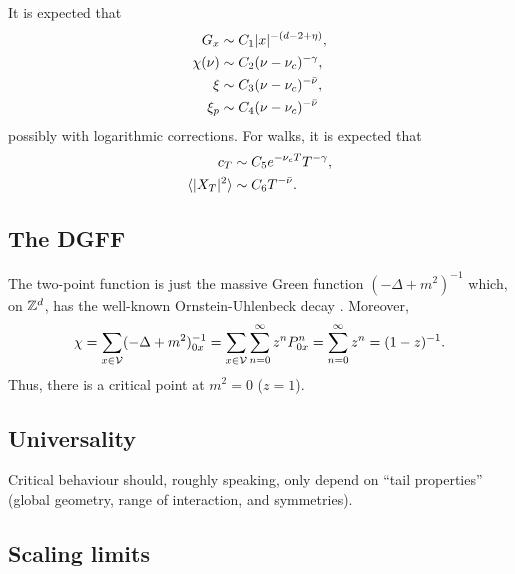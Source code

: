 It is expected that
\begin{align}
G_x       &\sim C_1 |x|^{-(d - 2 + \eta)}, \\
\chi(\nu) &\sim C_2 (\nu - \nu_c)^{-\gamma}, \\
\xi       &\sim C_3 (\nu - \nu_c)^{-\bar\nu}, \\
\xi_p     &\sim C_4 (\nu - \nu_c)^{-\bar\nu}
\end{align}
possibly with logarithmic corrections.
For walks, it is expected that
\begin{align}
c_T                       &\sim C_5 e^{-\nu_c T} T^{-\gamma}, \\
\langle |X_T|^2 \rangle   &\sim C_6 T^{-\bar\nu}.
\end{align}


\subsection{The DGFF}

The two-point function is just the massive Green function $(-\Delta + m^2)^{-1}$
which, on ${ {{\mathbb Z}}^d }$, has the well-known Ornstein-Uhlenbeck decay .
Moreover,
\begin{equation}
\chi
  =
\sum_{x\in\mathcal{V}} (-\Delta + m^2)^{-1}_{0x}
  =
\sum_{x\in\mathcal{V}} \sum_{n=0}^\infty z^n P^n_{0x}
  =
\sum_{n=0}^\infty z^n
  =
(1 - z)^{-1}.
\end{equation}
Thus, there is a critical point at $m^2 = 0$ ($z = 1$).




\subsection{Universality}

Critical behaviour should, roughly speaking, only depend on ``tail properties''
(global geometry, range of interaction, and symmetries).


\subsection{Scaling limits}

